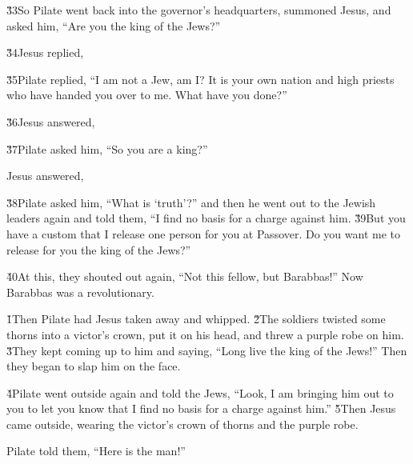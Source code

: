 \v{33}So Pilate went back into the governor's headquarters, summoned Jesus, and asked him, ``Are you the king of the Jews?''

\v{34}Jesus replied, 

\v{35}Pilate replied, ``I am not a Jew, am I? It is your own nation and high priests who have handed you over to me. What have you done?''

\v{36}Jesus answered,  

\v{37}Pilate asked him, ``So you are a king?''

Jesus answered, 

\v{38}Pilate asked him, ``What is `truth'?'' and then he went out to the Jewish leaders again and told them, ``I find no basis for a charge against him. \v{39}But you have a custom that I release one person for you at Passover. Do you want me to release for you the king of the Jews?''

\v{40}At this, they shouted out again, ``Not this fellow, but Barabbas!'' Now Barabbas was a revolutionary.

\v{1}Then Pilate had Jesus taken away and whipped. \v{2}The soldiers twisted some thorns into a victor's crown, put it on his head, and threw a purple robe on him. \v{3}They kept coming up to him and saying, ``Long live the king of the Jews!'' Then they began to slap him on the face.

\v{4}Pilate went outside again and told the Jews, ``Look, I am bringing him out to you to let you know that I find no basis for a charge against him.'' \v{5}Then Jesus came outside, wearing the victor's crown of thorns and the purple robe.

Pilate told them, ``Here is the man!''

